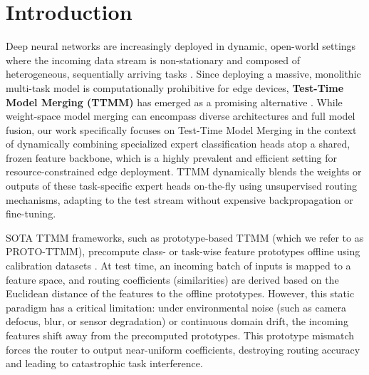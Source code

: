 \documentclass{article}
\theoremstyle{plain}
\theoremstyle{definition}
\theoremstyle{remark}
\begin{document}
\section{Introduction}
\label{sec:intro}
Deep neural networks are increasingly deployed in dynamic, open-world settings where the incoming data stream is non-stationary and composed of heterogeneous, sequentially arriving tasks \cite{cl_w_fisher}. Since deploying a massive, monolithic multi-task model is computationally prohibitive for edge devices, \textbf{Test-Time Model Merging (TTMM)} has emerged as a promising alternative \cite{df_bayes_ttmm, kt_fisher}. While weight-space model merging can encompass diverse architectures and full model fusion, our work specifically focuses on Test-Time Model Merging in the context of dynamically combining specialized expert classification heads atop a shared, frozen feature backbone, which is a highly prevalent and efficient setting for resource-constrained edge deployment. TTMM dynamically blends the weights or outputs of these task-specific expert heads on-the-fly using unsupervised routing mechanisms, adapting to the test stream without expensive backpropagation or fine-tuning.

SOTA TTMM frameworks, such as prototype-based TTMM (which we refer to as PROTO-TTMM), precompute class- or task-wise feature prototypes offline using calibration datasets \cite{cl_w_fisher, kt_fisher}. At test time, an incoming batch of inputs is mapped to a feature space, and routing coefficients (similarities) are derived based on the Euclidean distance of the features to the offline prototypes. However, this static paradigm has a critical limitation: under environmental noise (such as camera defocus, blur, or sensor degradation) or continuous domain drift, the incoming features shift away from the precomputed prototypes. This prototype mismatch forces the router to output near-uniform coefficients, destroying routing accuracy and leading to catastrophic task interference.
\end{document}
